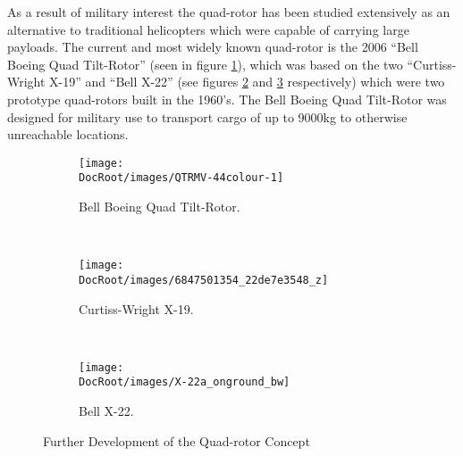 As a result of military interest the quad-rotor has been studied extensively as an alternative to traditional helicopters which were capable of carrying large payloads. The current and most widely known quad-rotor is the 2006 “Bell Boeing Quad Tilt-Rotor” (seen in figure \ref{fig:Bell Boeing Quad TiltRotor}), which was based on the two “Curtiss-Wright X-19” and “Bell X-22”  (see figures \ref{fig:Curtiss-Wright X-19.} and \ref{fig:Bell X-22.} respectively) which were two prototype quad-rotors built in the 1960's. The Bell Boeing Quad Tilt-Rotor was designed for military use to transport cargo of up to 9000kg to otherwise unreachable locations.   


\begin{figure}[h]
	\centering
	\begin{subfigure}[b]{0.35\textwidth}
		\texttt{[image: \\DocRoot/images/QTRMV-44colour-1]}
		\caption{Bell Boeing Quad Tilt-Rotor.}
		\label{fig:Bell Boeing Quad TiltRotor}
	\end{subfigure}%
	~ %
	\begin{subfigure}[b]{0.3\textwidth}
		\texttt{[image: \\DocRoot/images/6847501354\_22de7e3548\_z]}
		\caption{Curtiss-Wright X-19.}
		\label{fig:Curtiss-Wright X-19.}
	\end{subfigure}
	~ %
	\begin{subfigure}[b]{0.3\textwidth}
		\texttt{[image: \\DocRoot/images/X-22a\_onground\_bw]}
		\caption{Bell X-22.}
		\label{fig:Bell X-22.}
	\end{subfigure}
	\caption{Further Development of the Quad-rotor Concept \cite{Principles_of_helicopter_aerodynamics}}\label{fig:Further Development of the Quadrotor Concept}
\end{figure}


